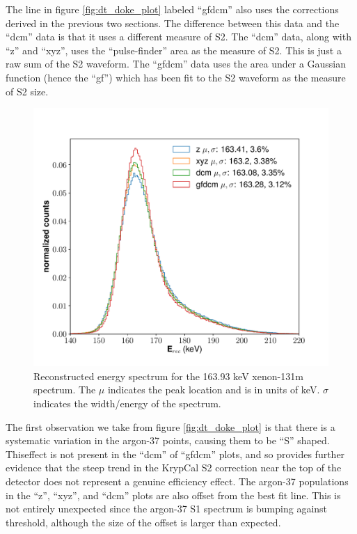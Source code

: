The line in figure \ref{fig:dt_doke_plot} labeled ``gfdcm'' also uses the corrections derived in the previous two sections. The difference between this data and the ``dcm'' data is that it uses a different measure of S2. The ``dcm'' data, along with ``z'' and ``xyz'', uses the ``pulse-finder'' area as the measure of S2. This is just a raw sum of the S2 waveform. The ``gfdcm'' data uses the area under a Gaussian function (hence the ``gf'') which has been fit to the S2 waveform as the measure of S2 size.   
\begin{figure}[h!]
  \centering
  \includegraphics[width=\textwidth]{Figures/E_spec_Xe.pdf}
  \caption{Reconstructed energy spectrum for the 163.93 keV xenon-131m spectrum. The $\mu$ indicates the peak location and is in units of keV. $\sigma$ indicates the width/energy of the spectrum.}
\label{fig:E_spec_Xe} 
\end{figure}

The first observation we take from figure \ref{fig:dt_doke_plot} is that there is a systematic variation in the argon-37 points, causing them to be ``S'' shaped. Thiseffect is not present in the ``dcm'' of ``gfdcm'' plots, and so provides further evidence that the steep trend in the KrypCal S2 correction near the top of the detector does not represent a genuine efficiency effect. The argon-37 populations in the ``z'', ``xyz'', and ``dcm'' plots are also offset from the best fit line. This is not entirely unexpected since the argon-37 S1 spectrum is bumping against threshold, although the size of the offset is larger than expected.

